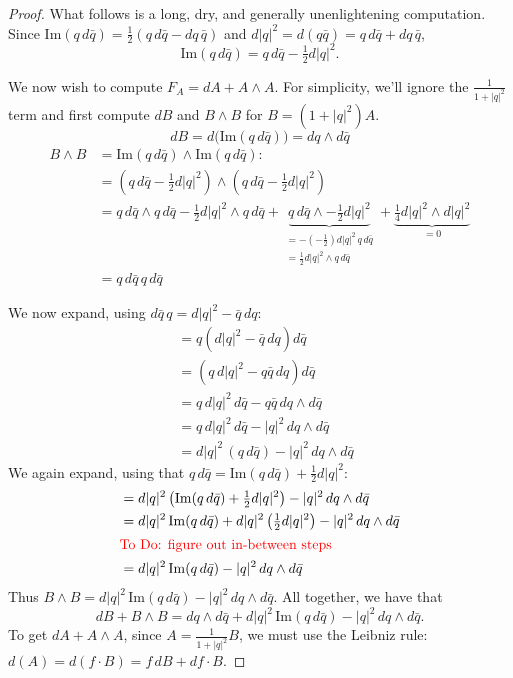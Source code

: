 \documentclass[main]{subfiles}
\begin{document}
\begin{proof}
What follows is a long, dry, and generally unenlightening computation. Since $\mathrm{Im}(q\,d\bar q)=\frac{1}{2}(q\,d\bar q-dq\,\bar q)$ and $d|q|^2=d(q\bar q)=q\,d\bar q+dq\,\bar q$,
\[
\mathrm{Im}(q\,d\bar q) = q\,d\bar q-\tfrac{1}{2}d|q|^2.
\]

We now wish to compute $F_A=dA+A\wedge A$. For simplicity, we'll ignore the $\frac{1}{1+|q|^2}$ term and first compute $dB$ and $B\wedge B$ for $B=(1+|q|^2)A$.
\[
dB = d\big(\mathrm{Im}(q\,d\bar q)\big) = dq\wedge d\bar q
\]
\begin{align*}
B\wedge B &= \mathrm{Im}(q\,d\bar q)\wedge\mathrm{Im}(q\,d\bar q):\\
&= \left(q\,d\bar q-\tfrac{1}{2}d|q|^2\right)\wedge\left(q\,d\bar q-\tfrac{1}{2}d|q|^2\right)\\
&= q\,d\bar q\wedge q\,d\bar q-\tfrac{1}{2}d|q|^2\wedge q\,d\bar q+\underbrace{q\,d\bar q\wedge-\tfrac{1}{2}d|q|^2}_{\substack{=-\left(-\frac{1}{2}\right)d|q|^2\,q\,d\bar q\\ =\frac{1}{2}d|q|^2\wedge q\,d\bar q}}+\underbrace{\tfrac{1}{4}d|q|^2\wedge d|q|^2}_{=0}\\
&= q\,d\bar q\,q\,d\bar q
\end{align*}

We now expand, using $d\bar q\,q=d|q|^2-\bar q\,dq$:
\begin{align*}
&= q\left(d|q|^2-\bar q\,dq\right)d\bar q\\
&= \left(q\,d|q|^2-q\bar q\,dq\right)d\bar q\\
&= q\,d|q|^2\,d\bar q-q\bar q\,dq\wedge d\bar q\\
&= q\,d|q|^2\,d\bar q-|q|^2\,dq\wedge d\bar q\\
&= d|q|^2\,(q\,d\bar q)-|q|^2\,dq\wedge d\bar q
\end{align*}
We again expand, using that $q\,d\bar q=\mathrm{Im}(q\,d\bar q)+\frac{1}{2}d|q|^2$:
\begin{align*}
&= d|q|^2\left(\mathrm{Im}(q\,d\bar q)+\tfrac{1}{2}d|q|^2\right)-|q|^2\,dq\wedge d\bar q\\
&= d|q|^2\,\mathrm{Im}(q\,d\bar q)+d|q|^2\left(\tfrac{1}{2}d|q|^2\right)-|q|^2\,dq\wedge d\bar q\\
\intertext{\textcolor{red}{To Do: figure out in-between steps}}
&= d|q|^2\,\mathrm{Im}(q\,d\bar q)-|q|^2\,dq\wedge d\bar q
\end{align*}
Thus $B\wedge B=d|q|^2\,\mathrm{Im}(q\,d\bar q)-|q|^2\,dq\wedge d\bar q$. All together, we have that
\[
dB+B\wedge B = dq\wedge d\bar q+d|q|^2\,\mathrm{Im}(q\,d\bar q)-|q|^2\,dq\wedge d\bar q.
\]
To get $dA+A\wedge A$, since $A=\frac{1}{1+|q|^2}B$, we must use the Leibniz rule: $d(A)=d(f\cdot B)=f\,dB+df\cdot B$.


\end{proof}
\end{document}
